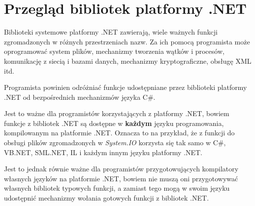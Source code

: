 ﻿\section{Przegląd bibliotek platformy .NET}

Biblioteki systemowe platformy .NET zawierają, 
wiele ważnych funkcji zgromadzonych w różnych przestrzeniach nazw. Za ich pomocą programista
może oprogramować system plików, mechanizmy tworzenia wątków i procesów, komunikację z siecią i bazami danych,
mechanizmy kryptograficzne, obsługę XML itd. 

Programista powinien odróżniać funkcje udostępniane
przez biblioteki platformy .NET od bezpośrednich mechanizmów języka C\#. 

Jest to ważne dla programistów
korzystających z platformy .NET, bowiem funkcje 
z bibliotek .NET są dostępne w {\bf każdym} języku programowania, kompilowanym na platformie .NET. 
Oznacza to na przykład, że z funkcji do obsługi plików zgromadzonych w {\em System.IO} korzysta się
tak samo w C\#, VB.NET, SML.NET, IL i każdym innym języku platformy .NET. 

Jest to jednak równie ważne dla programistów przygotowujących kompilatory własnych języków na platformie
.NET, bowiem nie muszą oni przygotowywać własnych bibliotek typowych funkcji, a zamiast tego 
mogą w swoim języku udostępnić mechanizmy wołania gotowych funkcji z bibliotek .NET.






